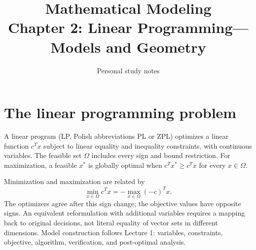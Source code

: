 \documentclass[11pt,a4paper]{article}
\title{\textbf{Mathematical Modeling}\\[2mm]
\large Chapter 2: Linear Programming---Models and Geometry}
\author{Personal study notes}
\date{}
\begin{document}
\maketitle
\lecturelegend
\tableofcontents

\section{The linear programming problem}\label{sec:lp}
\begin{lecturecore}
  A linear program (LP, Polish abbreviations PL or ZPL) optimizes a linear function
  $c^Tx$ subject to linear equality and inequality constraints, with continuous
  variables. The feasible set $\Omega$ includes every sign and bound restriction.
  For maximization, a feasible $x^*$ is globally optimal when
  $c^Tx^*\geq c^Tx$ for every $x\in\Omega$.
\end{lecturecore}

Minimization and maximization are related by
\[
  \min_{x\in\Omega}c^Tx=-\max_{x\in\Omega}(-c)^Tx.
\]
The optimizers agree after this sign change; the objective values have opposite
signs. An equivalent reformulation with additional variables requires a mapping
back to original decisions, not literal equality of vector sets in different dimensions.
Model construction follows Lecture 1: variables, constraints, objective,
algorithm, verification, and post-optimal analysis.
\end{document}
